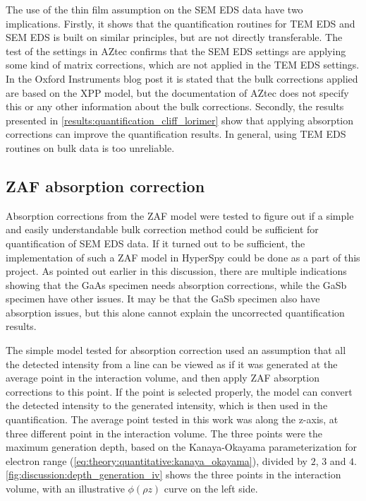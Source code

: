 The use of the thin film assumption on the SEM EDS data have two implications.
Firstly, it shows that the quantification routines for TEM EDS and SEM EDS is built on similar principles, but are not directly transferable.
The test of the settings in AZtec confirms that the SEM EDS settings are applying some kind of matrix corrections, which are not applied in the TEM EDS settings.
In the Oxford Instruments blog post\cite{oxford_blog_XPP} it is stated that the bulk corrections applied are based on the XPP model, but the documentation of AZtec does not specify this or any other information about the bulk corrections\cite{aztec_manual}.
Secondly, the results presented in \cref{results:quantification_cliff_lorimer} show that applying absorption corrections can improve the quantification results.
In general, using TEM EDS routines on bulk data is too unreliable.




\subsection{ZAF absorption correction}
\label{discussion:quantitative:zaf_absorption_correction}

Absorption corrections from the ZAF model were tested to figure out if a simple and easily understandable bulk correction method could be sufficient for quantification of SEM EDS data.
If it turned out to be sufficient, the implementation of such a ZAF model in HyperSpy could be done as a part of this project.
As pointed out earlier in this discussion, there are multiple indications showing that the GaAs specimen needs absorption corrections, while the GaSb specimen have other issues.
It may be that the GaSb specimen also have absorption issues, but this alone cannot explain the uncorrected quantification results.


The simple model tested for absorption correction used an assumption that all the detected intensity from a line can be viewed as if it was generated at the average point in the interaction volume, and then apply ZAF absorption corrections to this point.
If the point is selected properly, the model can convert the detected intensity to the generated intensity, which is then used in the quantification.
The average point tested in this work was along the z-axis, at three different point in the interaction volume.
The three points were the maximum generation depth, based on the Kanaya-Okayama parameterization for electron range (\cref{eq:theory:quantitative:kanaya_okayama}), divided by $2$, $3$ and $4$.
\cref{fig:discussion:depth_generation_iv} shows the three points in the interaction volume, with an illustrative $\phi (\rho z)$ curve on the left side.


